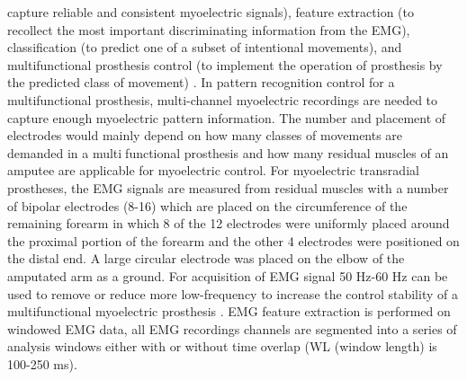 \documentclass{article}
\begin{document}
capture reliable and consistent myoelectric signals), feature extraction (to recollect the most 
important discriminating information from the EMG), classification (to predict one of a subset of 
intentional movements), and multifunctional prosthesis control (to implement the operation of 
prosthesis by the predicted class of movement) .
In pattern recognition control for a multifunctional prosthesis, multi-channel myoelectric recordings 
are needed to capture enough myoelectric pattern information. The number and placement of 
electrodes would mainly depend on how many classes of movements are demanded in a multifunctional prosthesis and how many residual muscles of an amputee are applicable for myoelectric 
control. For myoelectric transradial prostheses, the EMG signals are measured from residual muscles 
with a number of bipolar electrodes (8-16) which are placed on the circumference of the remaining 
forearm in which 8 of the 12 electrodes were uniformly placed around the proximal portion of the 
forearm and the other 4 electrodes were positioned on the distal end. A large circular electrode was 
placed on the elbow of the amputated arm as a ground.
For acquisition of EMG signal 50 Hz-60 Hz can be used to remove or reduce more low-frequency to 
increase the control stability of a multifunctional myoelectric prosthesis . EMG feature extraction is 
performed on windowed EMG data, all EMG recordings channels are segmented into a series of 
analysis windows either with or without time overlap (WL (window length) is 100-250 ms).
\end{document}
